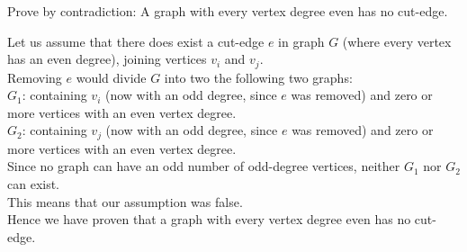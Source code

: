 \documentclass[12pt]{article}
\newenvironment{question}[2][Question]{\begin{trivlist}
\item[\hskip \labelsep {\bfseries #1}\hskip \labelsep {\bfseries #2.}]}{\end{trivlist}}
\begin{document}
\begin{question}{8}
Prove by contradiction: A graph with every vertex degree even has no cut-edge.
\end{question}

Let us assume that there does exist a cut-edge $e$ in graph $G$ (where every vertex has an even degree), joining vertices $v_i$ and $v_j$.\\
Removing $e$ would divide $G$ into two the following two graphs:\\
$G_1$: containing $v_i$ (now with an odd degree, since $e$ was removed) and zero or more vertices with an even vertex degree.\\
$G_2$: containing $v_j$ (now with an odd degree, since $e$ was removed) and zero or more vertices with an even vertex degree.\\
Since no graph can have an odd number of odd-degree vertices, neither $G_1$ nor $G_2$ can exist.\\
This means that our assumption was false.\\
Hence we have proven that a graph with every vertex degree even has no cut-edge.




\end{document}
